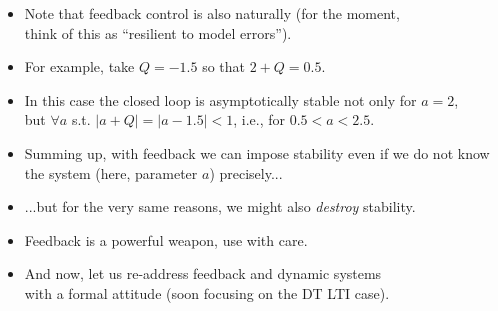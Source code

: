 \begin{frame}
\myPause
 \begin{itemize}[<+-| alert@+>]
 \item Note that feedback control is also naturally  (for the moment,\\
       think of this as ``resilient to model errors'').
 \item For example, take $Q=-1.5$ so that $2+Q=0.5$.
 \item In this case the closed loop is asymptotically stable not only for $a=2$,\\
       but $\forall a$ s.t. $|a+Q|=|a-1.5|<1$, i.e., for $0.5<a<2.5$.
 \item \vspace{4mm} Summing up, with feedback we can impose stability even if we do not know\\
       the system (here, parameter $a$) precisely...
 \item[]\vspace{-1mm} ...but for the very same reasons, we might also \emph{destroy} stability.
 \item Feedback is a powerful weapon, use with care.
 \item \vfill And now, let us re-address feedback and dynamic systems\\
       with a formal attitude (soon focusing on the DT LTI case).
 \end{itemize}
\end{frame}


